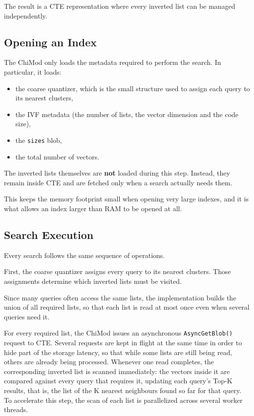 \documentclass[11pt]{article}
\begin{document}
The result is a CTE representation where every inverted list can be
managed independently.

\subsection{Opening an Index}

The ChiMod only loads the metadata required to perform the search. In
particular, it loads:

\begin{itemize}
\item the coarse quantizer, which is the small structure used to assign
each query to its nearest clusters,
\item the IVF metadata (the number of lists, the vector dimension and
the code size),
\item the \texttt{sizes} blob,
\item the total number of vectors.
\end{itemize}

The inverted lists themselves are \textbf{not} loaded during this
step. Instead, they remain inside CTE and are fetched only when a
search actually needs them.

This keeps the memory footprint small when opening very large
indexes, and it is what allows an index larger than RAM to be opened
at all.

\subsection{Search Execution}

Every search follows the same sequence of operations.

First, the coarse quantizer assigns every query to its nearest
clusters. Those assignments determine which inverted lists must be
visited.

Since many queries often access the same lists, the implementation
builds the union of all required lists, so that each list is read at
most once even when several queries need it.

For every required list, the ChiMod issues an asynchronous
\texttt{AsyncGetBlob()} request to CTE. Several requests are kept in
flight at the same time in order to hide part of the storage latency,
so that while some lists are still being read, others are already
being processed. Whenever one read completes, the corresponding
inverted list is scanned immediately: the vectors inside it are
compared against every query that requires it, updating each query's
Top-K results, that is, the list of the K nearest neighbours found so
far for that query. To accelerate this step, the scan of each list is
parallelized across several worker threads.
\end{document}
